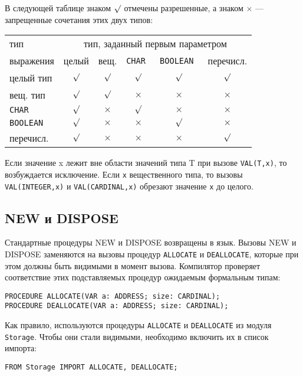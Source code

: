 В следующей таблице знаком $\surd$ отмечены разрешенные, а 
знаком $\times$ --- запрещенные сочетания этих двух типов:
\begin{center}
\begin{tabular}{|lccccc|} \hline
тип         & \multicolumn{5}{c}{тип, заданный первым параметром} \\
выражения   & целый   & вещ.     & \tt CHAR   &\tt BOOLEAN  & перечисл. \\ \hline
целый тип   & $\surd$ & $\surd$  & $\surd$  & $\surd$  & $\surd$  \\
вещ. тип    & $\surd$ & $\surd$  & $\times$ & $\times$ & $\times$ \\
\tt CHAR    & $\surd$ & $\times$ & $\surd$  & $\times$ & $\times$ \\
\tt BOOLEAN & $\surd$ & $\times$ & $\times$ & $\surd$  & $\times$ \\
перечисл.   & $\surd$ & $\times$ & $\times$ & $\times$ & $\surd$  \\
\hline
\end{tabular}
\end{center}

Если значение x лежит вне области значений типа
T при вызове {\tt VAL(T,x)}, то возбуждается исключение. 
Если {\tt x} вещественного типа, то вызовы
{\tt VAL(INTEGER,x)} и {\tt VAL(CARDINAL,x)} обрезают 
значение {\tt x} до целого.

\subsection{NEW и DISPOSE}\label{m2:ISO:NEW}

Стандартные процедуры NEW и DISPOSE возвращены в язык.
Вызовы NEW и DISPOSE заменяются на вызовы процедур
{\tt ALLOCATE} и {\tt DEALLOCATE}, которые при этом должны быть
видимыми в момент вызова. Компилятор проверяет соответствие 
этих подставляемых процедур ожидаемым формальным типам:
\begin{verbatim}
PROCEDURE ALLOCATE(VAR a: ADDRESS; size: CARDINAL);
PROCEDURE DEALLOCATE(VAR a: ADDRESS; size: CARDINAL);
\end{verbatim}

Как правило, используются процедуры {\tt ALLOCATE} и {\tt DEALLOCATE}
из модуля {\tt Storage}. Чтобы они стали видимыми, необходимо
включить их в список импорта:
\begin{verbatim}
FROM Storage IMPORT ALLOCATE, DEALLOCATE;
\end{verbatim}

